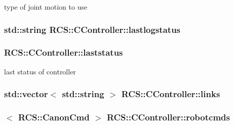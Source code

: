 type of joint motion to use \hypertarget{structRCS_1_1CController_a8bd2705747d1e16f5806ddf183bfade7}{
\subsubsection[{lastlogstatus}]{\setlength{\rightskip}{0pt plus 5cm}std\-::string R\-C\-S\-::\-C\-Controller\-::lastlogstatus}}\label{structRCS_1_1CController_a8bd2705747d1e16f5806ddf183bfade7}
\hypertarget{structRCS_1_1CController_af76ac9412dbefbaebc970d62f88a40fa}{
\subsubsection[{laststatus}]{ R\-C\-S\-::\-C\-Controller\-::laststatus\hspace{0.3cm}{\ttfamily [static]}}}\label{structRCS_1_1CController_af76ac9412dbefbaebc970d62f88a40fa}
last status of controller \hypertarget{structRCS_1_1CController_aa285781e418931357634dff5ef79a678}{
\subsubsection[{links}]{\setlength{\rightskip}{0pt plus 5cm}std\-::vector$<$ std\-::string $>$ R\-C\-S\-::\-C\-Controller\-::links\hspace{0.3cm}{\ttfamily [static]}}}\label{structRCS_1_1CController_aa285781e418931357634dff5ef79a678}
\hypertarget{structRCS_1_1CController_aa96c7961737b7e1cf5d8b4180f4bc399}{
\subsubsection[{robotcmds}]{$<$ {\bf R\-C\-S\-::\-Canon\-Cmd} $>$ R\-C\-S\-::\-C\-Controller\-::robotcmds\hspace{0.3cm}{\ttfamily [static]}}}\label{structRCS_1_1CController_aa96c7961737b7e1cf5d8b4180f4bc399}
